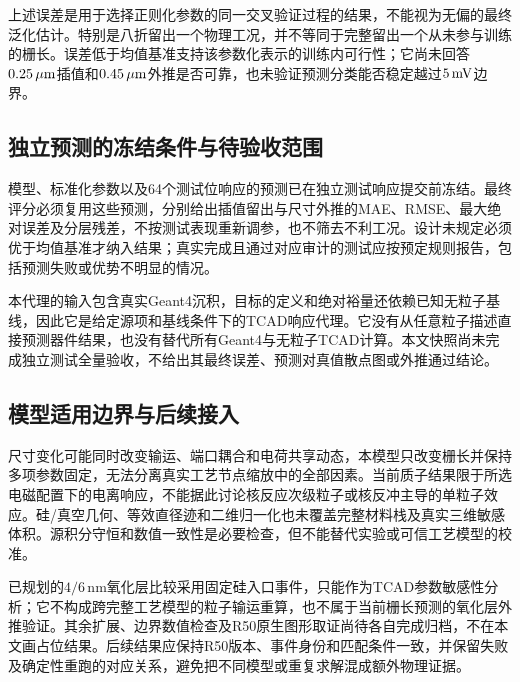上述误差是用于选择正则化参数的同一交叉验证过程的结果，不能视为无偏的最终泛化估计。特别是八折留出一个物理工况，并不等同于完整留出一个从未参与训练的栅长。误差低于均值基准支持该参数化表示的训练内可行性；它尚未回答$0.25\,\mu\mathrm{m}$插值和$0.45\,\mu\mathrm{m}$外推是否可靠，也未验证预测分类能否稳定越过$5\,\mathrm{mV}$边界。

\subsection{独立预测的冻结条件与待验收范围}
模型、标准化参数以及64个测试位响应的预测已在独立测试响应提交前冻结。最终评分必须复用这些预测，分别给出插值留出与尺寸外推的MAE、RMSE、最大绝对误差及分层残差，不按测试表现重新调参，也不筛去不利工况。设计未规定必须优于均值基准才纳入结果；真实完成且通过对应审计的测试应按预定规则报告，包括预测失败或优势不明显的情况。

本代理的输入包含真实Geant4沉积，目标的定义和绝对裕量还依赖已知无粒子基线，因此它是给定源项和基线条件下的TCAD响应代理。它没有从任意粒子描述直接预测器件结果，也没有替代所有Geant4与无粒子TCAD计算。本文快照尚未完成独立测试全量验收，不给出其最终误差、预测对真值散点图或外推通过结论。

\subsection{模型适用边界与后续接入}
尺寸变化可能同时改变输运、端口耦合和电荷共享动态，本模型只改变栅长并保持多项参数固定，无法分离真实工艺节点缩放中的全部因素。当前质子结果限于所选电磁配置下的电离响应，不能据此讨论核反应次级粒子或核反冲主导的单粒子效应。硅/真空几何、等效直径迹和二维归一化也未覆盖完整材料栈及真实三维敏感体积。源积分守恒和数值一致性是必要检查，但不能替代实验或可信工艺模型的校准。

已规划的$4/6\,\mathrm{nm}$氧化层比较采用固定硅入口事件，只能作为TCAD参数敏感性分析；它不构成跨完整工艺模型的粒子输运重算，也不属于当前栅长预测的氧化层外推验证。其余扩展、边界数值检查及R50原生图形取证尚待各自完成归档，不在本文画占位结果。后续结果应保持R50版本、事件身份和匹配条件一致，并保留失败及确定性重跑的对应关系，避免把不同模型或重复求解混成额外物理证据。

